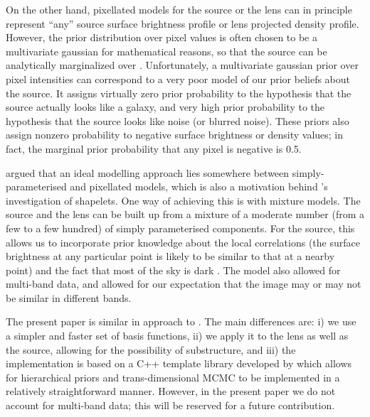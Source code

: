 \documentclass[useAMS,usenatbib]{mn2e}
\begin{document}
On the
other hand, pixellated models for the source \citep[e.g.][]{suyu} or the lens
\citep[e.g.][]{2014MNRAS.445.2181C} can in principle represent ``any''
source surface brightness profile or lens projected density profile. However, the prior
distribution over pixel values is often chosen to be a multivariate gaussian
for mathematical reasons, so
that the source can be analytically marginalized over
\citep{2003ApJ...590..673W}. Unfortunately, a multivariate gaussian prior
over pixel intensities can correspond to a very poor model of our prior
beliefs about the source. It assigns virtually zero prior probability
to the hypothesis that the source actually looks like a galaxy, and very high
prior probability to the hypothesis that the source looks like noise (or
blurred noise). These priors also assign nonzero probability to negative
surface brightness or density values; in fact, the marginal prior probability
that any pixel is negative is 0.5.

\citet{2011MNRAS.412.2521B} argued that an ideal
modelling approach lies somewhere between simply-parameterised and
pixellated models, which is also a motivation behind
\citet{2015arXiv150500198T}'s investigation of shapelets.
One way of achieving this is with mixture models.
The source and the lens can be built up from a mixture of a moderate
number (from a few to a few hundred) of
simply parameterised components. For the source, this allows
us to incorporate prior knowledge about the local correlations (the surface
brightness at any particular point is likely to be similar to that at a
nearby point) and the fact that most of the sky is
dark \citep{2006ApJ...637..608B}. The \citet{2011MNRAS.412.2521B} model also
allowed for multi-band data, and allowed for our expectation that the image
may or may not be similar in different bands.

The present paper is similar in approach to \citet{2011MNRAS.412.2521B}.
The main differences are:
i) we use a simpler and faster set of basis functions,
ii) we apply it to the lens as well as the source, allowing for the
possibility of substructure, and
iii) the implementation is based on a C++ template library developed by
\citet{rjobject} which allows for hierarchical priors and trans-dimensional
MCMC to be implemented in a relatively straightforward manner.
However, in the present paper we do not account for
multi-band data; this will be reserved for a future contribution.
\end{document}
